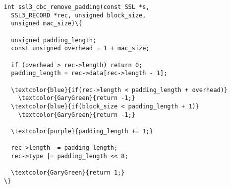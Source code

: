\begin{minipage}[t]{3.1in}
\small
\begin{Verbatim}
int ssl3_cbc_remove_padding(const SSL *s, 
  SSL3_RECORD *rec, unsigned block_size, 
  unsigned mac_size)\{

  unsigned padding_length;
  const unsigned overhead = 1 + mac_size;

  if (overhead > rec->length) return 0;
  padding_length = rec->data[rec->length - 1];

  \textcolor{blue}{if(rec->length < padding_length + overhead)}
    \textcolor{GaryGreen}{return -1;}
  \textcolor{blue}{if(block_size < padding_length + 1)}
    \textcolor{GaryGreen}{return -1;}

  \textcolor{purple}{padding_length += 1;}

  rec->length -= padding_length;
  rec->type |= padding_length << 8;

  \textcolor{GaryGreen}{return 1;}
\}
\end{Verbatim}
\end{minipage}
